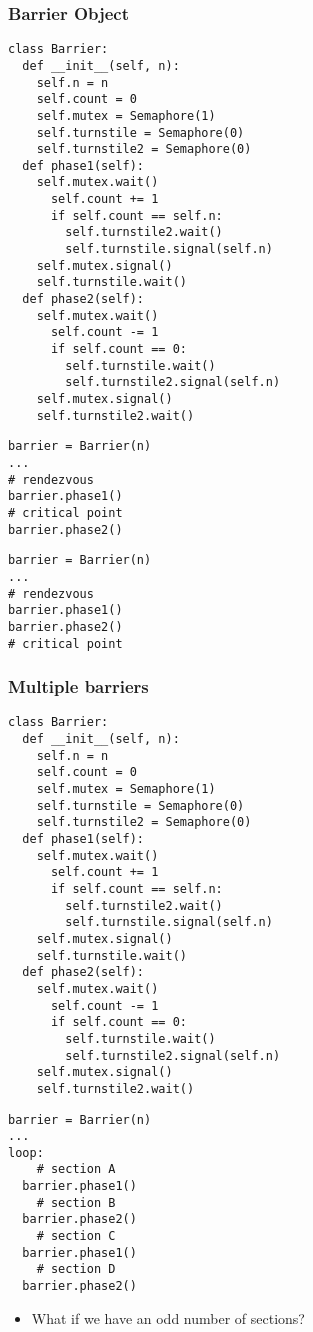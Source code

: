 \documentclass{beamer}
\newcommand{\bi}{\begin{itemize}}
\newcommand{\ii}{\item}
\newcommand{\ei}{\end{itemize}}
\newcommand{\bfr}[1]{\begin{frame}[fragile]\frametitle{{ #1 }}}
\begin{document}
\bfr{Barrier Object}
\begin{minipage}{0.6\textwidth}
\begin{Verbatim}[fontsize=\relsize{-2}]
class Barrier:
  def __init__(self, n):
    self.n = n
    self.count = 0
    self.mutex = Semaphore(1)
    self.turnstile = Semaphore(0)
    self.turnstile2 = Semaphore(0)
  def phase1(self):
    self.mutex.wait()
      self.count += 1
      if self.count == self.n:
        self.turnstile2.wait()
        self.turnstile.signal(self.n)
    self.mutex.signal()
    self.turnstile.wait()
  def phase2(self):
    self.mutex.wait()
      self.count -= 1
      if self.count == 0:
        self.turnstile.wait()
        self.turnstile2.signal(self.n)
    self.mutex.signal()
    self.turnstile2.wait()
\end{Verbatim}
\end{minipage}\begin{minipage}{0.4\textwidth}
\begin{Verbatim}
barrier = Barrier(n)
...
# rendezvous
barrier.phase1()
# critical point
barrier.phase2()
\end{Verbatim}
\begin{Verbatim}
barrier = Barrier(n)
...
# rendezvous
barrier.phase1()
barrier.phase2()
# critical point
\end{Verbatim}
\end{minipage}
\end{frame}


\bfr{Multiple barriers}
\begin{minipage}{0.6\textwidth}
\begin{Verbatim}[fontsize=\relsize{-2}]
class Barrier:
  def __init__(self, n):
    self.n = n
    self.count = 0
    self.mutex = Semaphore(1)
    self.turnstile = Semaphore(0)
    self.turnstile2 = Semaphore(0)
  def phase1(self):
    self.mutex.wait()
      self.count += 1
      if self.count == self.n:
        self.turnstile2.wait()
        self.turnstile.signal(self.n)
    self.mutex.signal()
    self.turnstile.wait()
  def phase2(self):
    self.mutex.wait()
      self.count -= 1
      if self.count == 0:
        self.turnstile.wait()
        self.turnstile2.signal(self.n)
    self.mutex.signal()
    self.turnstile2.wait()
\end{Verbatim}
\end{minipage}\begin{minipage}{0.4\textwidth}
\begin{Verbatim}
barrier = Barrier(n)
...
loop:
    # section A
  barrier.phase1()
    # section B
  barrier.phase2()
    # section C
  barrier.phase1()
    # section D
  barrier.phase2()
\end{Verbatim}
\pause\bi
\ii What if we have an odd number of sections?
\ei
\end{minipage}
\end{frame}
\end{document}
